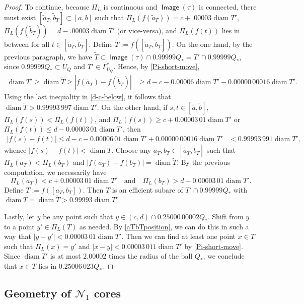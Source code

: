 \documentclass[12pt]{amsart}
\numberwithin{equation}{section}
\theoremstyle{plain}
\theoremstyle{definition}
\newcommand{\diam}{\mathop\mathrm{diam}\nolimits}
\newcommand{\Image}{\mathop\mathsf{Image}\nolimits}
\numberwithin{figure}{section}
\begin{document}
\begin{proof}
To continue, because $\Pi_L$ is continuous and $\Image(\tau)$ is connected, there must exist $[\tilde a_T,\tilde b_T]\subset[a,b]$ such that $\Pi_L(f(\tilde a_T))=c+.00003\diam T'$, $\Pi_L(f(\tilde b_T))=d-.00003\diam T'$ (or vice-versa), and $\Pi_L(f(t))$ lies in between for all $t\in[\tilde a_T,\tilde b_T]$. Define $\tilde T:=f([\tilde a_T,\tilde b_T])$. On the one hand, by the previous paragraph, we have $\tilde T\subset \Image(\tau)\cap 0.99999Q_*=T'\cap 0.99999Q_*$, since $0.99999Q_*\subset U_Q$ and $T'\in\Gamma^*_{U_Q}$. Hence, by \eqref{Pi-short-move}, \begin{align*}\diam T'\geq \diam \tilde T\geq |f(\tilde a_T)-f(\tilde b_T)| &\geq d-c-0.00006\diam T'-0.00000\,00016\diam T'.\end{align*} Using the last inequality in \eqref{d-c-below}, it follows that $\diam \tilde T>0.99993\,997\diam T'$. On the other hand, if $s,t\in[\tilde a,\tilde b]$, $\Pi_L(f(s))<\Pi_L(f(t))$, and $\Pi_L(f(s))\geq c+0.00003\,01\diam T'$ or $\Pi_L(f(t))\leq d-0.00003\,01\diam T'$, then \begin{align*}|f(s)-f(t)|\leq d-c-0.00006\,01\diam T' + 0.00000\,00016\diam T'&< 0.99993\,991\diam T',\end{align*} whence $|f(s)-f(t)|<\diam \tilde T$. Choose any $a_T,b_T\in[\tilde a_T,\tilde b_T]$ such that $\Pi_L(a_T)<\Pi_L(b_T)$ and $|f(a_T)-f(b_T)|=\diam \tilde T$. By the previous computation, we necessarily have \begin{equation}\label{aTbTposition} \Pi_L(a_T)<c+0.00003\,01\diam T'\quad\text{and}\quad \Pi_L(b_T)>d-0.00003\,01\diam T'.\end{equation} Define $T:=f([a_T,b_T])$. Then $T$ is an efficient subarc of $T'\cap 0.99999Q_*$ with $\diam T=\diam \tilde T>0.99993\diam T'$.

Lastly, let $y$ be any point such that $y \in (c,d)\cap 0.25000\,00002Q_*$. Shift from $y$ to a point $y'\in\Pi_L(T)$ as needed. By \eqref{aTbTposition}, we can do this in such a way that $|y-y'|<0.00003\,01\diam T'$. Then we can find at least one point $x\in T$ such that $\Pi_L(x)=y'$ and $|x-y|<0.00003\,011\diam T'$ by \eqref{Pi-short-move}. Since $\diam T'$ is at most $2.00002$ times the radius of the ball $Q_*$, we conclude that $x\in T$ lies in $0.25006\,023 Q_*$.
\end{proof}

\subsection{Geometry of $\mathcal{N}_1$ cores}
\end{document}
